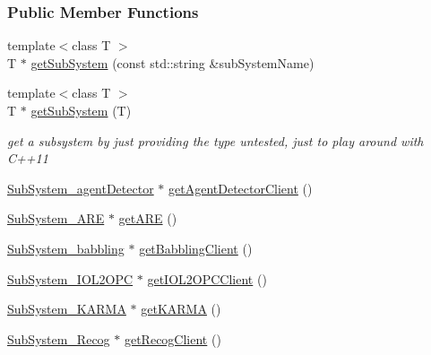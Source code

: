 \subsubsection*{Public Member Functions}
\begin{DoxyCompactItemize}
\item 
{\footnotesize template$<$class T $>$ }\\T $\ast$ \hyperlink{group__icubclient__clients_a7ad0d4360f735c3631b2bdaa3caa5d80}{get\+Sub\+System} (const std\+::string \&sub\+System\+Name)
\item 
{\footnotesize template$<$class T $>$ }\\T $\ast$ \hyperlink{group__icubclient__clients_ae62e5489f0412acc15304f68bbc0ac3a}{get\+Sub\+System} (T)
\begin{DoxyCompactList}\small\item\em get a subsystem by just providing the type untested, just to play around with C++11 \end{DoxyCompactList}\item 
\hyperlink{group__icubclient__subsystems_classicubclient_1_1SubSystem__agentDetector}{Sub\+System\+\_\+agent\+Detector} $\ast$ \hyperlink{group__icubclient__clients_ab9e784430f1aa872ec58bdaea716dc57}{get\+Agent\+Detector\+Client} ()
\item 
\hyperlink{group__icubclient__subsystems_classicubclient_1_1SubSystem__ARE}{Sub\+System\+\_\+\+A\+RE} $\ast$ \hyperlink{group__icubclient__clients_ad022d3754041d652ebc37044c7be047c}{get\+A\+RE} ()
\item 
\hyperlink{group__icubclient__subsystems_classicubclient_1_1SubSystem__babbling}{Sub\+System\+\_\+babbling} $\ast$ \hyperlink{group__icubclient__clients_a25bc61a476eae941aa5a25cd5d21a0d2}{get\+Babbling\+Client} ()
\item 
\hyperlink{group__icubclient__subsystems_classicubclient_1_1SubSystem__IOL2OPC}{Sub\+System\+\_\+\+I\+O\+L2\+O\+PC} $\ast$ \hyperlink{group__icubclient__clients_ae5b9052e8435d13811e30f3d74343536}{get\+I\+O\+L2\+O\+P\+C\+Client} ()
\item 
\hyperlink{group__icubclient__subsystems_classicubclient_1_1SubSystem__KARMA}{Sub\+System\+\_\+\+K\+A\+R\+MA} $\ast$ \hyperlink{group__icubclient__clients_a95285ba946061fa56e031f72b70110ed}{get\+K\+A\+R\+MA} ()
\item 
\hyperlink{group__icubclient__subsystems_classicubclient_1_1SubSystem__Recog}{Sub\+System\+\_\+\+Recog} $\ast$ \hyperlink{group__icubclient__clients_aa444258246f4ed1e3569a039db6f678c}{get\+Recog\+Client} ()

\end{DoxyCompactItemize}
